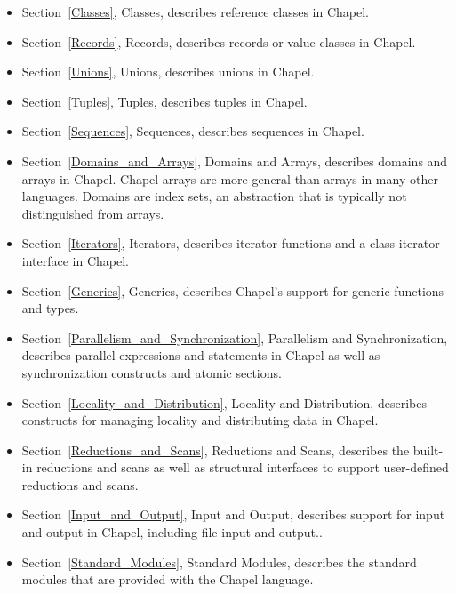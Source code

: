 \begin{itemize}
\item
Section~\ref{Classes}, Classes, describes reference classes in Chapel.

\item
Section~\ref{Records}, Records, describes records or value classes in
Chapel.

\item
Section~\ref{Unions}, Unions, describes unions in Chapel.

\item
Section~\ref{Tuples}, Tuples, describes tuples in Chapel.

\item
Section~\ref{Sequences}, Sequences, describes sequences in Chapel.

\item
Section~\ref{Domains_and_Arrays}, Domains and Arrays, describes
domains and arrays in Chapel.  Chapel arrays are more general than
arrays in many other languages.  Domains are index sets, an
abstraction that is typically not distinguished from arrays.

\item
Section~\ref{Iterators}, Iterators, describes iterator functions and a
class iterator interface in Chapel.

\item
Section~\ref{Generics}, Generics, describes Chapel's support for
generic functions and types.

\item
Section~\ref{Parallelism_and_Synchronization}, Parallelism and
Synchronization, describes parallel expressions and statements in
Chapel as well as synchronization constructs and atomic sections.

\item
Section~\ref{Locality_and_Distribution}, Locality and Distribution,
describes constructs for managing locality and distributing data in
Chapel.

\item
Section~\ref{Reductions_and_Scans}, Reductions and Scans, describes
the built-in reductions and scans as well as structural interfaces to
support user-defined reductions and scans.

\item
Section~\ref{Input_and_Output}, Input and Output, describes support
for input and output in Chapel, including file input and output..

\item
Section~\ref{Standard_Modules}, Standard Modules, describes the
standard modules that are provided with the Chapel language.

\end{itemize}
